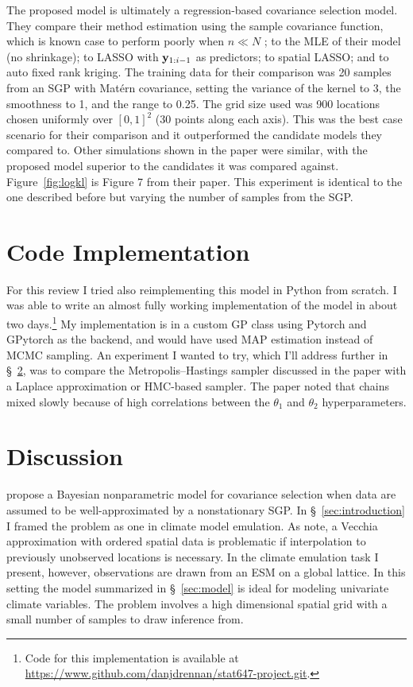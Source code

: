 \documentclass[letterpaper]{article}
\begin{document}
  The proposed model is ultimately a regression-based covariance selection
  model. They compare their method estimation using the sample covariance function,
  which is known case to perform poorly when $n \ll N$ \citep{Pourahmadi2011};
  to the MLE of their model (no shrinkage); to LASSO with $\mathbf{y}_{1:i-1}$ as
  predictors; to spatial LASSO; and to auto fixed rank kriging. The training
  data for their comparison was 20 samples from an SGP with Mat\'{e}rn covariance,
  setting the variance of the kernel to 3, the smoothness to 1, and the range
  to 0.25. The grid size used was 900 locations chosen uniformly over $[0, 1]^{2}$
  (30 points along each axis). This was the best case scenario for their comparison
  and it outperformed the candidate models they compared to. Other simulations
  shown in the paper were similar, with the proposed model superior to the
  candidates it was compared against. Figure~\ref{fig:logkl} is Figure 7 from
  their paper. This experiment is identical to the one described before but
  varying the number of samples from the SGP.


\section{Code Implementation}\label{sec:implementation}

  For this review I tried also reimplementing this model in Python from scratch.
  I was able to write an almost fully working implementation of the model in
  about two days.\footnote{Code for this implementation is available at
  \url{https://www.github.com/danjdrennan/stat647-project.git}.} My implementation
  is in a custom GP class using Pytorch and GPytorch as the backend, and would
  have used MAP estimation instead of MCMC sampling. An experiment I wanted to try,
  which I'll address further in \S~\ref{sec:discussion}, was to compare the
  Metropolis--Hastings sampler discussed in the paper with a Laplace approximation
  or HMC-based sampler. The paper noted that chains mixed slowly because of high
  correlations between the $\theta_{1}$ and $\theta_{2}$ hyperparameters.


\section{Discussion}\label{sec:discussion}

  \citet{Kidd2021} propose a Bayesian nonparametric model for covariance selection
  when data are assumed to be well-approximated by a nonstationary SGP. In
  \S~\ref{sec:introduction} I framed the problem as one in climate model emulation.
  As \citet{Banerjee2014} note, a Vecchia approximation with ordered spatial data
  is problematic if interpolation to previously unobserved locations is necessary.
  In the climate emulation task I present, however, observations are drawn from
  an ESM on a global lattice. In this setting the model summarized in \S~\ref{sec:model}
  is ideal for modeling univariate climate variables. The problem involves a
  high dimensional spatial grid with a small number of samples to draw inference
  from.
\end{document}
